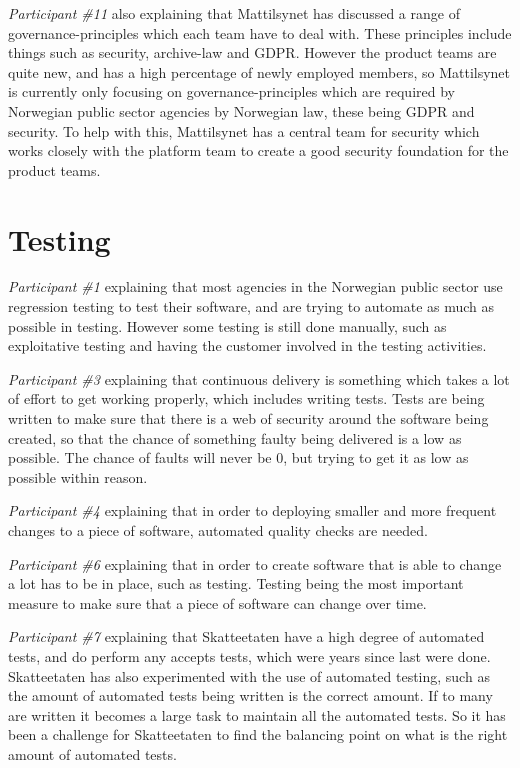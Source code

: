\textit{Participant \#11} also explaining that Mattilsynet has discussed a range of governance-principles which each team have to deal with. These principles include things such as security, archive-law and GDPR. However the product teams are quite new, and has a high percentage of newly employed members, so Mattilsynet is currently only focusing on governance-principles which are required by Norwegian public sector agencies by Norwegian law, these being GDPR and security.
To help with this, Mattilsynet has a central team for security which works closely with the platform team to create a good security foundation for the product teams. 

\section{Testing}
\textit{Participant \#1} explaining that most agencies in the Norwegian public sector use regression testing to test their software, and are trying to automate as much as possible in testing. However some testing is still done manually, such as exploitative testing and having the customer involved in the testing activities.

\textit{Participant \#3} explaining that continuous delivery is something which takes a lot of effort to get working properly, which includes writing tests. Tests are being written to make sure that there is a web of security around the software being created, so that the chance of something faulty being delivered is a low as possible. The chance of faults will never be 0, but trying to get it as low as possible within reason. 

\textit{Participant \#4} explaining that in order to deploying smaller and more frequent changes to a piece of software, automated quality checks are needed.

\textit{Participant \#6} explaining that in order to create software that is able to change a lot has to be in place, such as testing. Testing being the most important measure to make sure that a piece of software can change over time.

\textit{Participant \#7} explaining that Skatteetaten have a high degree of automated tests, and do perform any accepts tests, which were years since last were done. Skatteetaten has also experimented with the use of automated testing, such as the amount of automated tests being written is the correct amount. If to many are written it becomes a large task to maintain all the automated tests. So it has been a challenge for Skatteetaten to find the balancing point on what is the right amount of automated tests.

